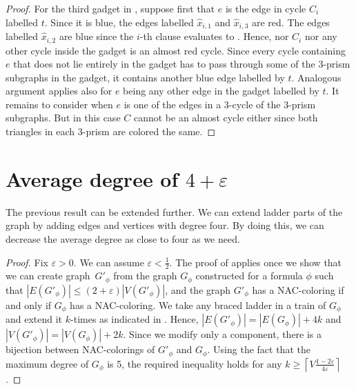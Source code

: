 \begin{proof}
	For the third gadget in ,
	suppose first that $e$ is the edge in cycle $C_i$ labelled $t$.
	Since it is blue, the edges labelled $\hat{x}_{i,1}$ and $\hat{x}_{i,3}$ are red.
	The edges labelled $\hat{x}_{i,2}$ are blue since the $i$-th  clause evaluates to \true{}.
	Hence, nor $C_i$ nor any other cycle inside the gadget is an almost red cycle.
	Since every cycle containing $e$ that does not lie entirely in the gadget
	has to pass through some of the 3-prism subgraphs in the gadget, it contains another blue edge labelled by $t$.
	Analogous argument applies also for $e$ being any other edge in the gadget labelled by $t$.
	It remains to consider when $e$ is one of the edges in a 3-cycle of the 3-prism subgraphs.
	But in this case $C$ cannot be an almost cycle either since both triangles in each 3-prism are colored the same.
\end{proof}


\section{Average degree of \( 4 + \varepsilon \)}

The previous result can be extended further.
We can extend ladder parts of the graph by adding
edges and vertices with degree four.
By doing this, we can decrease the average degree as close to four as we need.

\begin{proof}
	Fix $\varepsilon>0$. We can assume $\varepsilon<\frac{1}{2}$.
	The proof of  applies once we show that
	we can create graph~$G'_\phi$ from the graph $G_\phi$ constructed for a formula $\phi$
	such that $|E(G'_\phi)| \leq (2 + \varepsilon) |V(G'_\phi)|$, and
	the graph $G'_\phi$ has a NAC-coloring if and only if $G_\phi$ has a NAC-coloring.
	We take any braced ladder in a train of $G_\phi$
	and extend it $k$-times as indicated in .
	Hence, $|E(G'_\phi)| = |E(G_\phi)|+4k$ and $|V(G'_\phi)| = |V(G_\phi)|+2k$.
	Since we modify only a \trcon{} component,
	there is a bijection between NAC-colorings of $G'_\phi$ and $G_\phi$.
	Using the fact that the maximum degree of $G_\phi$ is 5,
	the required inequality holds for any  $k\geq\left\lceil V\frac{1-2\varepsilon}{4\varepsilon}\right\rceil$.
\end{proof}
